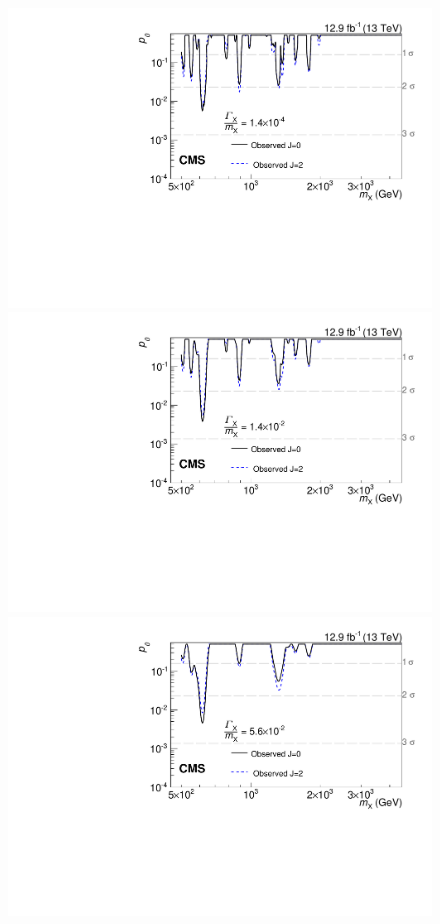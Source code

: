 \begin{figure}[!htb]
    \centering
    \includegraphics[width=\cmsFigWidth]{Figure_003-a.pdf}
    \includegraphics[width=\cmsFigWidth]{Figure_003-b.pdf}  \\
    \includegraphics[width=\cmsFigWidth]{Figure_003-c.pdf}

\end{figure}

